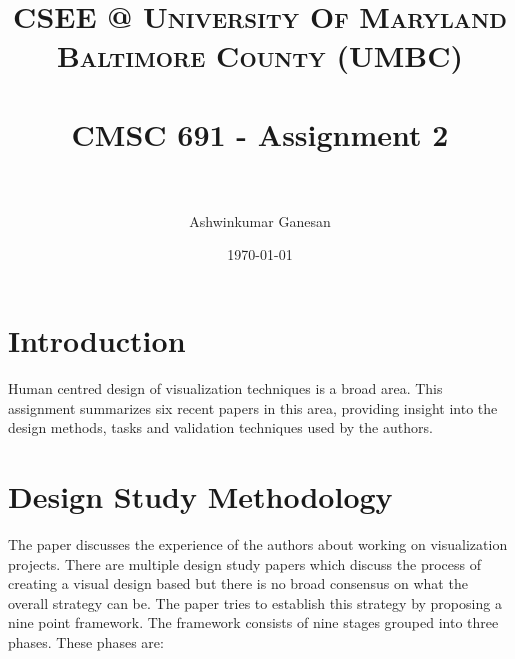 \documentclass[paper=a4, fontsize=11pt]{scrartcl}
\title{	
\normalfont \normalsize 
\textsc{CSEE @ University Of Maryland Baltimore County (UMBC)} \\ [25pt]
\horrule{0.5pt} \\[0.4cm] %
\huge CMSC 691 - Assignment 2 \\
\horrule{2pt} \\[0.5cm] %
}
\author{Ashwinkumar Ganesan}
\date{\normalsize\today}
\numberwithin{equation}{section} %
\numberwithin{figure}{section} %
\numberwithin{table}{section} %
\begin{document}
\maketitle %

\section{Introduction}
Human centred design of visualization techniques is a broad area. This assignment summarizes six recent papers in this area, providing insight into the design methods, tasks and validation techniques used by the authors.

\section{Design Study Methodology~\cite{sedlmair2012design}}
The paper discusses the experience of the authors about working on visualization projects. There are multiple design study papers which discuss the process of creating a visual design based but there is no broad consensus on what the overall strategy can be. The paper tries to establish this strategy by proposing a nine point framework. The framework consists of nine stages grouped into three phases. These phases are:
\end{document}
